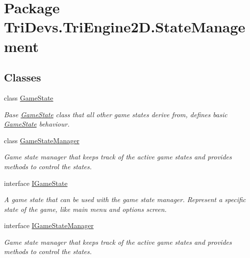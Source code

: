 \hypertarget{namespace_tri_devs_1_1_tri_engine2_d_1_1_state_management}{\section{Package Tri\-Devs.\-Tri\-Engine2\-D.\-State\-Management}
\label{namespace_tri_devs_1_1_tri_engine2_d_1_1_state_management}
}
\subsection*{Classes}
\begin{DoxyCompactItemize}
\item 
class \hyperlink{class_tri_devs_1_1_tri_engine2_d_1_1_state_management_1_1_game_state}{Game\-State}
\begin{DoxyCompactList}\small\item\em Base \hyperlink{class_tri_devs_1_1_tri_engine2_d_1_1_state_management_1_1_game_state}{Game\-State} class that all other game states derive from, defines basic \hyperlink{class_tri_devs_1_1_tri_engine2_d_1_1_state_management_1_1_game_state}{Game\-State} behaviour. \end{DoxyCompactList}\item 
class \hyperlink{class_tri_devs_1_1_tri_engine2_d_1_1_state_management_1_1_game_state_manager}{Game\-State\-Manager}
\begin{DoxyCompactList}\small\item\em Game state manager that keeps track of the active game states and provides methods to control the states. \end{DoxyCompactList}\item 
interface \hyperlink{interface_tri_devs_1_1_tri_engine2_d_1_1_state_management_1_1_i_game_state}{I\-Game\-State}
\begin{DoxyCompactList}\small\item\em A game state that can be used with the game state manager. Represent a specific state of the game, like main menu and options screen. \end{DoxyCompactList}\item 
interface \hyperlink{interface_tri_devs_1_1_tri_engine2_d_1_1_state_management_1_1_i_game_state_manager}{I\-Game\-State\-Manager}
\begin{DoxyCompactList}\small\item\em Game state manager that keeps track of the active game states and provides methods to control the states. \end{DoxyCompactList}\end{DoxyCompactItemize}
